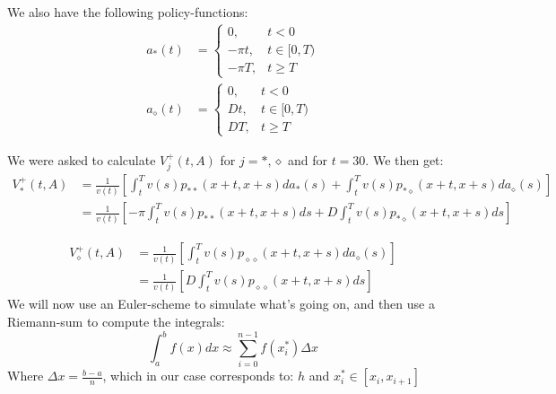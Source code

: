 \documentclass[
]{article}
\begin{document}
We also have the following policy-functions: \[\begin{aligned}
a_{*}(t) &= \begin{cases}
0, &t<0 \\
-\pi t, &t\in[0,T) \\ 
-\pi T, &t\geq T
\end{cases} \\ 
a_{\diamond}(t) &= \begin{cases}
0, &t<0 \\
Dt, &t\in[0,T) \\ 
DT, &t\geq T
\end{cases} 
\end{aligned}\]

We were asked to calculate \(V_{j}^{+}(t,A)\) for \(j = *, \diamond\)
and for \(t=30\). We then get: \[\begin{aligned}
V_{*}^{+}(t,A) &= \frac{1}{v(t)}\left[\int_{t}^{T}v(s)p_{**}(x+t,x+s)da_{*}(s)   
+ \int_{t}^{T}v(s)p_{*\diamond}(x+t,x+s)da_{\diamond}(s) 
\right] \\ 
&= \frac{1}{v(t)}\left[-\pi\int_{t}^{T}v(s)p_{**}(x+t,x+s)ds   
+ D\int_{t}^{T}v(s)p_{*\diamond}(x+t,x+s)ds 
\right]
\end{aligned}\]

\newpage

\[\begin{aligned}
V_{\diamond}^{+}(t,A) &= \frac{1}{v(t)}\left[
\int_{t}^{T}v(s)p_{\diamond \diamond}(x+t, x+s)da_{\diamond}(s)
\right] \\ 
&= \frac{1}{v(t)}\left[D
\int_{t}^{T}v(s)p_{\diamond \diamond}(x+t, x+s)ds
\right] 
\end{aligned}\] We will now use an Euler-scheme to simulate what's going
on, and then use a Riemann-sum to compute the integrals: \[
\int_{a}^{b}f(x)dx \approx \sum_{i=0}^{n-1}f(x_{i}^{*})\Delta x
\] Where \(\Delta x = \frac{b-a}{n}\), which in our case corresponds to:
\(h\) and \(x_{i}^{*} \in [x_{i},x_{i+1}]\)
\end{document}
